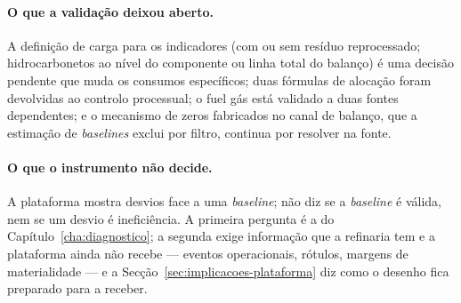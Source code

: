 \paragraph{O que a validação deixou aberto.} A definição de carga para os
indicadores (com ou sem resíduo reprocessado; hidrocarbonetos ao nível do
componente ou linha total do balanço) é uma decisão pendente que muda os
consumos específicos; duas fórmulas de alocação foram devolvidas ao
controlo processual; o fuel gás está validado a duas fontes dependentes; e
o mecanismo de zeros fabricados no canal de balanço, que a estimação de
\emph{baselines} exclui por filtro, continua por resolver na fonte.

\paragraph{O que o instrumento não decide.} A plataforma mostra desvios
face a uma \emph{baseline}; não diz se a \emph{baseline} é válida, nem se um
desvio é ineficiência. A primeira pergunta é a do
Capítulo~\ref{cha:diagnostico}; a segunda exige informação que a
refinaria tem e a plataforma ainda não recebe --- eventos operacionais,
rótulos, margens de materialidade --- e a Secção~\ref{sec:implicacoes-plataforma}
diz como o desenho fica preparado para a receber.
